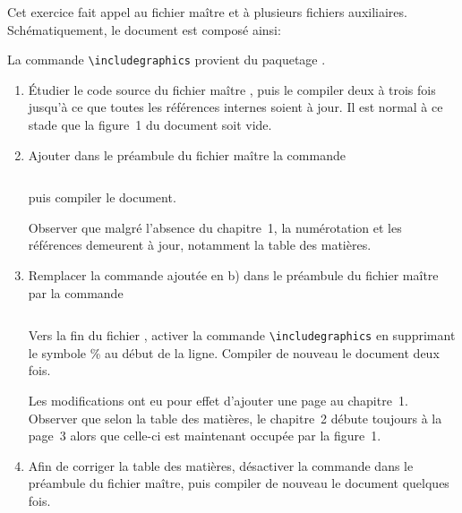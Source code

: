 \begin{exercice}
  \label{ex:include}
  Cet exercice fait appel au fichier maître
   et à plusieurs fichiers auxiliaires.
  Schématiquement, le document est composé ainsi:

  \begin{minipage}{\linewidth}
  \end{minipage}

  La commande \verb=\includegraphics= provient du paquetage
  .

  \begin{enumerate}
  \item Étudier le code source du fichier maître
    , puis le compiler deux à trois
    fois jusqu'à ce que toutes les références internes soient à jour.
    Il est normal à ce stade que la figure~1 du document soit vide.
  \item Ajouter dans le préambule du fichier maître la commande
\begin{lstlisting}

\end{lstlisting}
    puis compiler le document.

    Observer que malgré l'absence du chapitre~1, la numérotation et
    les références demeurent à jour, notamment la table des matières.
  \item Remplacer la commande ajoutée en b) dans le préambule du
    fichier maître par la commande
\begin{lstlisting}

\end{lstlisting}
    Vers la fin du fichier , activer la
    commande \verb=\includegraphics= en supprimant le symbole \% au
    début de la ligne. Compiler de nouveau le document deux fois.

    Les modifications ont eu pour effet d'ajouter une page au
    chapitre~1. Observer que selon la table des matières, le
    chapitre~2 débute toujours à la page~3 alors que celle-ci est
    maintenant occupée par la figure~1.
  \item Afin de corriger la table des matières, désactiver la
    commande \verb== dans le préambule du fichier maître,
    puis compiler de nouveau le document quelques fois.
  \end{enumerate}
\end{exercice}


